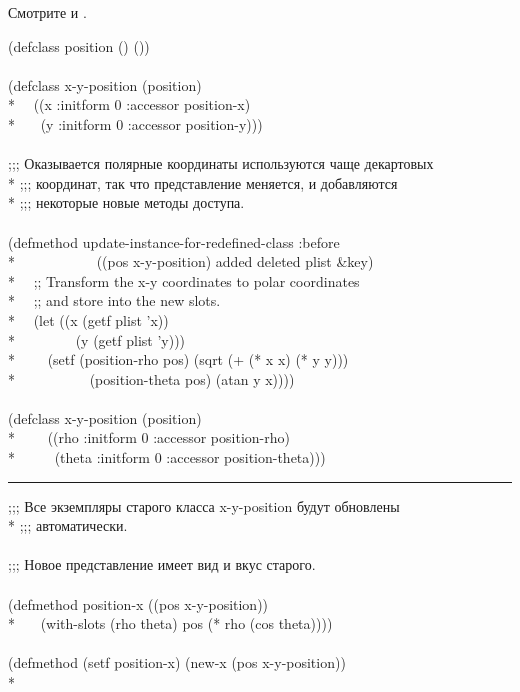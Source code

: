 \begin{defun}
Смотрите  и .

\begin{lisp}
(defclass position () ()) \\
\\
(defclass x-y-position (position) \\*
~~((x :initform 0 :accessor position-x) \\*
~~~(y :initform 0 :accessor position-y))) \\
\\
;;; Оказывается полярные координаты используются чаще декартовых \\*
;;; координат, так что представление меняется, и добавляются  \\*
;;; некоторые новые методы доступа. \\
\\
(defmethod update-instance-for-redefined-class :before \\*
~~~~~~~~~~~((pos x-y-position) added deleted plist \&key) \\*
~~;; Transform the x-y coordinates to polar coordinates \\*
~~;; and store into the new slots. \\*
~~(let ((x (getf plist 'x)) \\*
~~~~~~~~(y (getf plist 'y))) \\*
~~~~(setf (position-rho pos) (sqrt (+ (* x x) (* y y))) \\*
~~~~~~~~~~(position-theta pos) (atan y x)))) \\
\\
(defclass x-y-position (position) \\*
~~~~((rho :initform 0 :accessor position-rho) \\*
~~~~~(theta :initform 0 :accessor position-theta)))
\end{lisp}
\hrule width 0pt\relax
\begin{lisp}
;;; Все экземпляры старого класса x-y-position будут обновлены \\*
;;; автоматически. \\
\\
;;; Новое представление имеет вид и вкус старого. \\
\\
(defmethod position-x ((pos x-y-position)) \\*
~~~(with-slots (rho theta) pos (* rho (cos theta)))) \\
\\
(defmethod (setf position-x) (new-x (pos x-y-position)) \\*

\end{lisp}
\end{defun}
